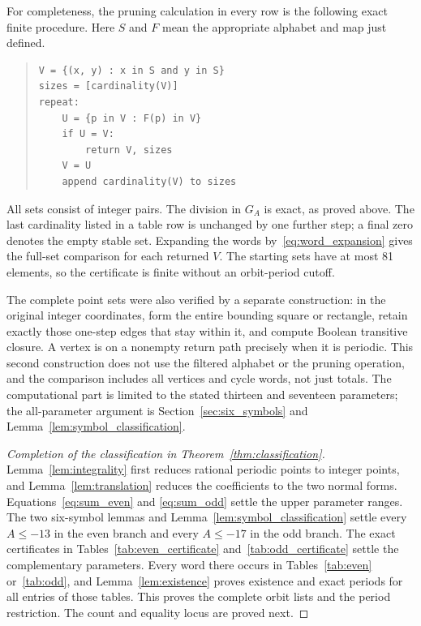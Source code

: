For completeness, the pruning calculation in every row is the
following exact finite procedure. Here \(S\) and \(F\) mean the
appropriate alphabet and map just defined.
\begin{quote}
\begin{verbatim}
V = {(x, y) : x in S and y in S}
sizes = [cardinality(V)]
repeat:
    U = {p in V : F(p) in V}
    if U = V:
        return V, sizes
    V = U
    append cardinality(V) to sizes
\end{verbatim}
\end{quote}
All sets consist of integer pairs. The division in \(G_A\) is exact,
as proved above. The last cardinality listed in a table row is unchanged
by one further step; a final zero denotes the empty stable set.
Expanding the words by~\eqref{eq:word_expansion} gives the full-set
comparison for each returned \(V\). The starting sets have at most
81 elements, so the certificate is finite without an orbit-period
cutoff.

The complete point sets were also verified by a separate construction:
in the original integer coordinates, form the entire bounding square
or rectangle, retain exactly those one-step edges that stay within it,
and compute Boolean transitive closure. A vertex is on a nonempty
return path precisely when it is periodic. This second construction
does not use the filtered alphabet or the pruning operation, and the
comparison includes all vertices and cycle words, not just totals.
The computational part is limited to the stated thirteen and seventeen
parameters; the all-parameter argument is
Section~\ref{sec:six_symbols} and Lemma~\ref{lem:symbol_classification}.

\begin{proof}[Completion of the classification in
Theorem~\ref{thm:classification}]
Lemma~\ref{lem:integrality} first reduces rational periodic points to
integer points, and Lemma~\ref{lem:translation} reduces the coefficients
to the two normal forms. Equations~\eqref{eq:sum_even} and
\eqref{eq:sum_odd} settle the upper parameter ranges. The two
six-symbol lemmas and Lemma~\ref{lem:symbol_classification} settle
every \(A\le-13\) in the even branch and every \(A\le-17\) in the
odd branch. The exact certificates in
Tables~\ref{tab:even_certificate} and~\ref{tab:odd_certificate}
settle the complementary parameters. Every word there occurs in
Tables~\ref{tab:even} or~\ref{tab:odd}, and
Lemma~\ref{lem:existence} proves existence and exact periods for all
entries of those tables. This proves the complete orbit lists and the
period restriction. The count and equality locus are proved next.
\end{proof}
